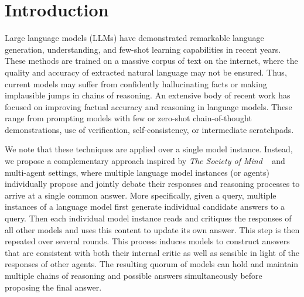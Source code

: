 \section{Introduction}

Large language models (LLMs) have demonstrated remarkable language generation, understanding, and few-shot learning capabilities in recent years. These methods are trained on a massive corpus of text on the internet, where the quality and accuracy of extracted natural language may not be ensured. Thus, current models may suffer from confidently hallucinating facts or making implausible jumps in chains of reasoning. An extensive body of recent work has focused on improving factual accuracy and reasoning in language models. These range from prompting models with few or zero-shot chain-of-thought demonstrations, use of verification, self-consistency, or intermediate scratchpads.

We note that these techniques are applied over a single model instance. Instead, we propose a complementary approach inspired by \emph{The Society of Mind} ~\citep{minsky1988society} and multi-agent settings, where multiple language model instances (or agents) individually propose and jointly debate their responses and reasoning processes to arrive at a single common answer. More specifically, given a query, multiple instances of a language model first generate individual candidate answers to a query. Then each individual model instance  reads and critiques the responses of all other models and uses this content to update its own answer. This step is then repeated over several rounds. This process induces models to construct answers that are consistent with both their internal critic as well as sensible in light of the responses of other agents. The resulting quorum of models can hold and maintain multiple chains of reasoning and possible answers simultaneously before proposing the final answer.

